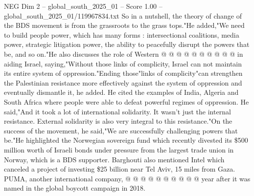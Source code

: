 \begin{textsample}{NEG Dim 2 – global\_south\_2025\_01 – Score 1.00 – global\_south\_2025\_01/119967834.txt}
So in a nutshell, the theory of change of the BDS movement is from the grassroots to the grass tops."He added,"We need to build people power, which has many forms : intersectional coalitions, media power, strategic litigation power, the ability to peacefully disrupt the powers that be, and so on."He also discusses the role of Western @ @ @ @ @ @ @ @ @ @ in aiding Israel, saying,"Without those links of complicity, Israel can not maintain its entire system of oppression."Ending those"links of complicity"can strengthen the Palestinian resistance more effectively against the system of oppression and eventually dismantle it, he added.
He cited the examples of India, Algeria and South Africa where people were able to defeat powerful regimes of oppression.
He said,"And it took a lot of international solidarity.
It wasn't just the internal resistance.
External solidarity is also very integral to this resistance."On the success of the movement, he said,"We are successfully challenging powers that be."He highlighted the Norwegian sovereign fund which recently divested its \$500 million worth of Israeli bonds under pressure from the largest trade union in Norway, which is a BDS supporter.
Barghouti also mentioned Intel which canceled a project of investing \$25 billion near Tel Aviv, 15 miles from Gaza.
PUMA, another international company, @ @ @ @ @ @ @ @ @ @ year after it was named in the global boycott campaign in 2018.

\end{textsample}
